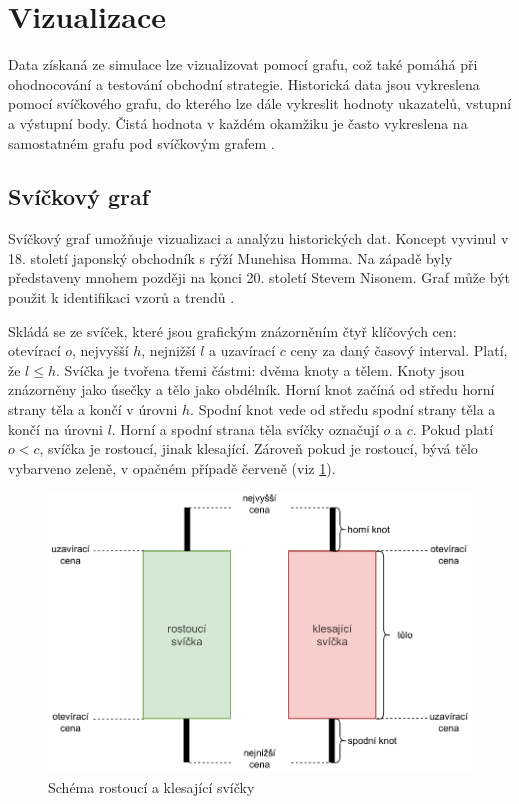 \section{Vizualizace}
Data získaná ze simulace lze vizualizovat pomocí grafu, což také pomáhá při ohodnocování a testování obchodní strategie.
Historická data jsou vykreslena pomocí svíčkového grafu, do kterého lze dále vykreslit hodnoty ukazatelů, vstupní a výstupní body.
Čistá hodnota v každém okamžiku je často vykreslena na samostatném grafu pod svíčkovým grafem \cite{pardo}.

\subsection{Svíčkový graf}
Svíčkový graf umožňuje vizualizaci a analýzu historických dat.
Koncept vyvinul v 18. století japonský obchodník s rýží Munehisa Homma.
Na západě byly představeny mnohem později na konci 20. století Stevem Nisonem.
Graf může být použit k identifikaci vzorů a trendů \cite{candlestick-corporate}.

Skládá se ze svíček, které jsou grafickým znázorněním čtyř klíčových cen: otevírací $o$, nejvyšší $h$, nejnižší $l$ a uzavírací $c$ ceny za daný časový interval.
Platí, že $l\leq h$.
Svíčka je tvořena třemi částmi: dvěma knoty a tělem.
Knoty jsou znázorněny jako úsečky a tělo jako obdélník.
Horní knot začíná od středu horní strany těla a končí v úrovni $h$.
Spodní knot vede od středu spodní strany těla a končí na úrovni $l$.
Horní a spodní strana těla svíčky označují $o$ a $c$.
Pokud platí $o<c$, svíčka je rostoucí, jinak klesající.
Zároveň pokud je rostoucí, bývá tělo vybarveno zeleně, v opačném případě červeně (viz \ref{fig:candles:diagram})\cite{candlestick-corporate}.

\begin{figure}[htbp]
\centerline{\includegraphics[scale=0.72]{img/candles-diagram.pdf}}
\caption{Schéma rostoucí a klesající svíčky}
\label{fig:candles:diagram}
\end{figure}

